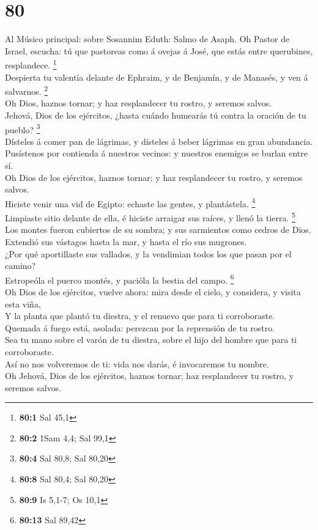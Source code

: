 \hypertarget{section-79}{%
\section{80}\label{section-79}}

 Al Músico principal: sobre Sosannim Eduth: Salmo de
Asaph. Oh Pastor de Israel, escucha: tú que pastoreas como á ovejas á
José, que estás entre querubines, resplandece. \footnote{\textbf{80:1}
  Sal 45,1}\\
 Despierta tu valentía delante de Ephraim, y de Benjamín,
y de Manasés, y ven á salvarnos. \footnote{\textbf{80:2} 1Sam 4,4; Sal
  99,1}\\
 Oh Dios, haznos tornar; y haz resplandecer tu rostro, y
seremos salvos.\\
 Jehová, Dios de los ejércitos, ¿hasta cuándo humearás tú
contra la oración de tu pueblo? \footnote{\textbf{80:4} Sal 80,8; Sal
  80,20}\\
 Dísteles á comer pan de lágrimas, y dísteles á beber
lágrimas en gran abundancia.\\
 Pusístenos por contienda á nuestros vecinos: y nuestros
enemigos se burlan entre sí.\\
 Oh Dios de los ejércitos, haznos tornar; y haz
resplandecer tu rostro, y seremos salvos.\\
 Hiciste venir una vid de Egipto: echaste las gentes, y
plantástela. \footnote{\textbf{80:8} Sal 80,4; Sal 80,20}\\
 Limpiaste sitio delante de ella, é hiciste arraigar sus
raíces, y llenó la tierra. \footnote{\textbf{80:9} Is 5,1-7; Os 10,1}\\
 Los montes fueron cubiertos de su sombra; y sus
sarmientos como cedros de Dios.\\
 Extendió sus vástagos hasta la mar, y hasta el río sus
mugrones.\\
 ¿Por qué aportillaste sus vallados, y la vendimian todos
los que pasan por el camino?\\
 Estropeóla el puerco montés, y pacióla la bestia del
campo. \footnote{\textbf{80:13} Sal 89,42}\\
 Oh Dios de los ejércitos, vuelve ahora: mira desde el
cielo, y considera, y visita esta viña,\\
 Y la planta que plantó tu diestra, y el renuevo que para
ti corroboraste.\\
 Quemada á fuego está, asolada: perezcan por la
reprensión de tu rostro.\\
 Sea tu mano sobre el varón de tu diestra, sobre el hijo
del hombre que para ti corroboraste.\\
 Así no nos volveremos de ti: vida nos darás, é
invocaremos tu nombre.\\
 Oh Jehová, Dios de los ejércitos, haznos tornar; haz
resplandecer tu rostro, y seremos salvos.


